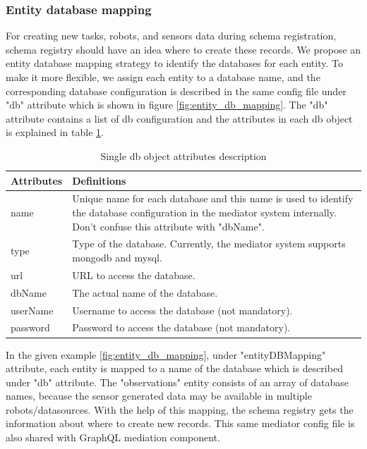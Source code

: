 	\subsubsection{Entity database mapping}
	For creating new tasks, robots, and sensors data during schema registration, schema registry should have an idea where to create these records. We propose an entity database mapping strategy to identify the databases for each entity. To make it more flexible, we assign each entity to a database name, and the corresponding database configuration is described in the same config file under "db" attribute which is shown in figure \ref{fig:entity_db_mapping}. The "db" attribute contains a list of db configuration and the attributes in each db object is explained in table \ref{tab:db_attribute_desc}. 
	
	\begin{table}[h!]
		\begin{tabular}{|l|p{12cm}|}
			\hline
			\textbf{Attributes} & \textbf{Definitions} \\ \hline
			
			name & Unique name for each database and this name is used to identify the database configuration in the mediator system internally. Don't confuse this attribute with "dbName". \\ \hline
			type & Type of the database. Currently, the mediator system supports mongodb and mysql. \\ \hline
			url & URL to access the database. \\ \hline
			dbName & The actual name of the database. \\ \hline
			userName & Username to access the database (not mandatory). \\ \hline
			password & Password to access the database (not mandatory). \\ \hline
			
		\end{tabular}
		\caption{Single db object attributes description}
		\label{tab:db_attribute_desc}
	\end{table}
	
	
	In the given example \ref{fig:entity_db_mapping}, under "entityDBMapping" attribute, each entity is mapped to a name of the database which is described under "db" attribute. The "observations" entity consists of an array of database names, because the sensor generated data may be available in multiple robots/datasources. With the help of this mapping, the schema registry gets the information about where to create new records. This same mediator config file is also shared with GraphQL mediation component.
	

